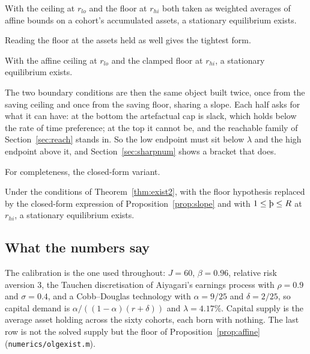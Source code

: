 \begin{theorem}\label{thm:exist4}
With the ceiling at $r_{lo}$ and the floor at $r_{hi}$ both taken as weighted averages of affine
bounds on a cohort's accumulated assets, a stationary equilibrium exists.
\end{theorem}

Reading the floor at the assets held as well gives the tightest form.

\begin{theorem}\label{thm:exist5}
With the affine ceiling at $r_{lo}$ and the clamped floor at $r_{hi}$, a stationary equilibrium
exists.
\end{theorem}

The two boundary conditions are then the same object built twice, once from the saving ceiling and
once from the saving floor, sharing a slope. Each half asks for what it can have: at the bottom
the artefactual cap is slack, which holds below the rate of time preference; at the top it cannot
be, and the reachable family of Section~\ref{sec:reach} stands in. So the low endpoint must sit
below $\lambda$ and the high endpoint above it, and Section~\ref{sec:sharpnum} shows a bracket that
does.

For completeness, the closed-form variant.

\begin{theorem}\label{thm:exist3}
Under the conditions of Theorem~\ref{thm:exist2}, with the floor hypothesis replaced by the
closed-form expression of Proposition~\ref{prop:slope} and with $1\le\Thorn\le R$ at $r_{hi}$, a
stationary equilibrium exists.
\end{theorem}

\subsection{What the numbers say}\label{sec:num2}

The calibration is the one used throughout: $J=60$, $\beta=0.96$, relative risk aversion $3$, the
Tauchen discretisation of Aiyagari's earnings process with $\rho=0.9$ and $\sigma=0.4$, and a
Cobb--Douglas technology with $\alpha=9/25$ and $\delta=2/25$, so capital demand is
$\alpha/((1-\alpha)(r+\delta))$ and $\lambda=4.17\%$. Capital supply is the average asset holding
across the sixty cohorts, each born with nothing. The last row is not the solved supply but the
floor of Proposition~\ref{prop:affine} (\texttt{numerics/olgexist.m}).


